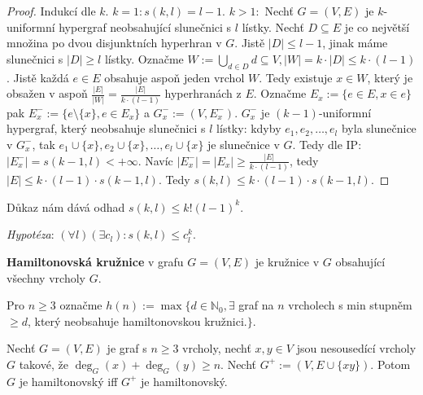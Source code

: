 \begin{proof}
	Indukcí dle $k$. $k=1: s(k,l) = l -1$. $k > 1:$ Nechť $G= (V,E)$ je $k$-uniformní hypergraf neobsahující slunečnici s $l$ lístky. Nechť $D \subseteq E$ je co největší množina po dvou disjunktních hyperhran v $G$. Jistě $|D| \leq l - 1$, jinak máme slunečnici s $|D| \geq l$ lístky. Označme $W := \bigcup_{d \in D} d \subseteq V, |W| = k \cdot |D| \leq k \cdot (l - 1)$. Jistě každá $e \in E$ obsahuje aspoň jeden vrchol $W$. Tedy existuje $x \in W$, který je obsažen v aspoň $\frac{|E|}{|W|} = \frac{|E|}{k \cdot(l-1)}$ hyperhranách z $E$. Označme $E_{x} := \{ e \in E, x \in e\}$ pak $E_{x}^{-} := \{ e \setminus \{x\}, e \in E_{x}\}$ a $G_{x}^{-} := (V,E_{x}^{-})$. $G_{x}^{-}$ je $(k-1)$-uniformní hypergraf, který neobsahuje slunečnici s $l$ lístky: kdyby $e_{1},e_{2}, \dots ,e_{l}$ byla slunečnice v $G_{x}^{-}$, tak $e_{1} \cup \{x\}, e_{2} \cup \{x\}, \dots, e_{l} \cup \{x\}$ je slunečnice v $G$. Tedy dle IP: $|E_{x}^{-}| = s(k-1,l) < + \infty$. Navíc $|E_{x}^{-}| = |E_{x}| \geq \frac{|E|}{k \cdot (l-1)}$, tedy $|E| \leq k \cdot (l-1) \cdot s(k-1,l)$. Tedy $s(k,l) \leq k \cdot (l-1) \cdot s(k-1,l)$.
\end{proof}

\begin{pozn}
	Důkaz nám dává odhad $s(k,l) \leq k!(l-1)^{k}$.
\end{pozn}

\textit{Hypotéza}: $(\forall l)(\exists c_{l}): s(k,l) \leq c_{l}^{k}$.

\begin{definice}
	\textbf{Hamiltonovská kružnice} v grafu $G = (V,E)$ je kružnice v $G$ obsahující všechny vrcholy $G$.
\end{definice}

\begin{definice}
	Pro $n \geq 3$ označme $h(n) := \max \{d \in \mathbb{N}_{0}, \exists$ graf na $n$ vrcholech s min stupněm $\geq d$, který neobsahuje hamiltonovskou kružnici.$\}$.
\end{definice}

\begin{veta}
	Nechť $G = (V,E)$ je graf s $n \geq 3$ vrcholy, nechť $x,y \in V$ jsou nesousedící vrcholy $G$ takové, že $\deg_{G}(x) + \deg_{G}(y) \geq n$. Nechť $G^{+}:= (V,E\cup\{xy\})$. Potom $G$ je hamiltonovský iff $G^{+}$ je hamiltonovský.
\end{veta}

